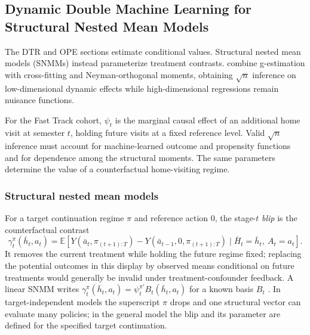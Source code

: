 \subsection{Dynamic Double Machine Learning for Structural Nested Mean Models}
\label{subsec:dml_dte}

The DTR and OPE sections estimate conditional values. Structural nested mean models (SNMMs) instead parameterize treatment contrasts. \citet{lewisSyrgkanis2021dynamicDML} combine g-estimation with cross-fitting and Neyman-orthogonal moments, obtaining $\sqrt n$ inference on low-dimensional dynamic effects while high-dimensional regressions remain nuisance functions.

For the Fast Track cohort, $\psi_t$ is the marginal causal effect of an additional home visit at semester $t$, holding future visits at a fixed reference level. Valid $\sqrt n$ inference must account for machine-learned outcome and propensity functions and for dependence among the structural moments. The same parameters determine the value of a counterfactual home-visiting regime.

\subsubsection*{Structural nested mean models}

For a target continuation regime $\pi$ and reference action $0$, the stage-$t$ \emph{blip} is the counterfactual contrast
\begin{equation}
\gamma_t^\pi(\bar h_t,a_t)
=
\mathbb E\!\left[
Y(\bar a_t,\pi_{(t+1):T})
-Y(\bar a_{t-1},0,\pi_{(t+1):T})
\mid \bar H_t=\bar h_t,\ A_t=a_t
\right].
\label{eq:blip_definition}
\end{equation}
It removes the current treatment while holding the future regime fixed; replacing the potential outcomes in this display by observed means conditional on future treatments would generally be invalid under treatment-confounder feedback. A linear SNMM writes $\gamma_t^\pi(\bar h_t,a_t)=\psi_t^{\pi\prime}B_t(\bar h_t,a_t)$ for a known basis $B_t$ \citep{robins2004snmm, lewisSyrgkanis2021dynamicDML}. In target-independent models the superscript $\pi$ drops and one structural vector can evaluate many policies; in the general model the blip and its parameter are defined for the specified target continuation.


